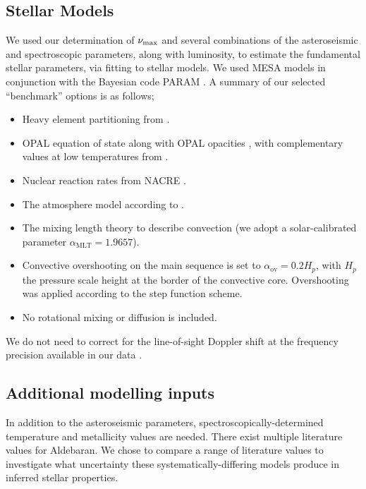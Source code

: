 \documentclass[modern]{aastex61}
\newcommand{\numax}{\mbox{$\nu_{\rm max}$}\xspace}
\begin{document}
\subsection{Stellar Models}\label{sec:stell_mod}
We used our determination of \numax and several combinations of the asteroseismic and spectroscopic parameters, along with luminosity, to estimate the fundamental stellar parameters, via fitting to stellar models. We used \textsc{MESA} models \citep{2011Paxton,2013Paxton} in conjunction with the Bayesian code \textsc{PARAM} \citep{2006dasilva, 2017Rod}.  A summary of our selected ``benchmark'' options is as follows;
\begin{itemize}%
\item Heavy element partitioning from \cite{1993Grevesse}.
\item OPAL equation of state \citep{2002Rogers} along with OPAL opacities \citep{1996Iglesias}, with complementary values at low temperatures from \cite{2005Ferguson}.
\item Nuclear reaction rates from NACRE \citep{1999Angulo}.
\item The atmosphere model according to \cite{1966Kris}.
\item The mixing length theory to describe convection (we adopt a solar-calibrated parameter $\alpha_{\textrm{MLT}} =1.9657$).
\item Convective overshooting on the main sequence is set to $\alpha_{\textrm{ov}}=0.2H_{p}$, with $H_{p}$ the pressure scale height at the border of the convective core. Overshooting was applied according to the \cite{1975Maeder} step function
scheme.
\item No rotational mixing or diffusion is included.
\end{itemize}
We do not need to correct for the line-of-sight Doppler shift at the frequency precision available in our data \citep{2014MNRAS.445L..94D}.
\subsection{Additional modelling inputs}\label{sec:addmod}
In addition to the asteroseismic parameters, spectroscopically-determined temperature and metallicity values are needed. There exist multiple literature values for Aldebaran. We chose to compare a range of literature values to investigate what uncertainty these systematically-differing models produce in inferred stellar properties.
\end{document}
